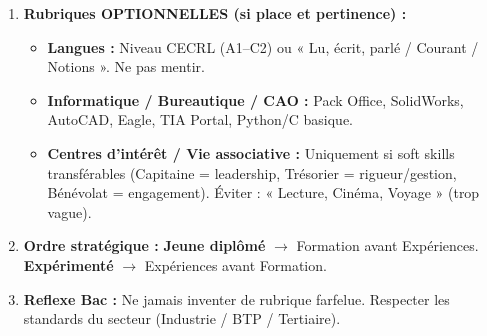 \documentclass[11pt]{article}
\newcommand{\cle}[1]{{\popxbold\color{popdark}#1}}
\begin{document}
\begin{methode}
\begin{enumerate}
        \item \textbf{Rubriques OPTIONNELLES (si place et pertinence) :}
              \begin{itemize}
                  \item \textbf{Langues :} Niveau CECRL (A1--C2) ou « Lu, écrit, parlé / Courant / Notions ». Ne pas mentir.
                  \item \textbf{Informatique / Bureautique / CAO :} Pack Office, SolidWorks, AutoCAD, Eagle, TIA Portal, Python/C basique.
                  \item \textbf{Centres d'intérêt / Vie associative :} Uniquement si \cle{soft skills} transférables (Capitaine = leadership, Trésorier = rigueur/gestion, Bénévolat = engagement). Éviter : « Lecture, Cinéma, Voyage » (trop vague).
              \end{itemize}
        \item \textbf{Ordre stratégique :} \textbf{Jeune diplômé} $\rightarrow$ Formation avant Expériences. \textbf{Expérimenté} $\rightarrow$ Expériences avant Formation.
        \item \textbf{Reflexe Bac :} Ne jamais inventer de rubrique farfelue. Respecter les standards du secteur (Industrie / BTP / Tertiaire).
    \end{enumerate}
\end{methode}
\end{document}
